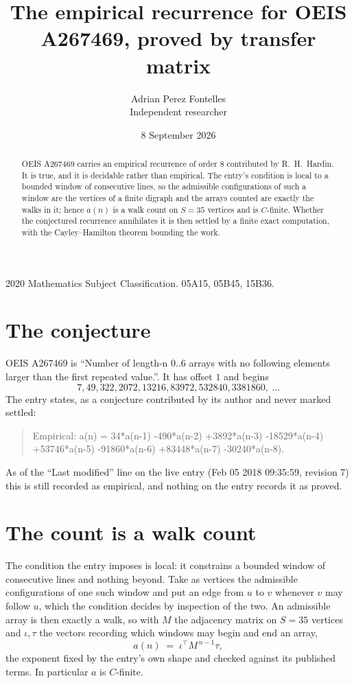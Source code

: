 \documentclass[11pt,a4paper]{article}
\title{The empirical recurrence for OEIS A267469, proved by transfer matrix}
\author{Adrian Perez Fontelles\\ \small Independent researcher}
\date{8 September 2026}
\theoremstyle{plain}
\theoremstyle{definition}
\begin{document}
\maketitle

\begin{abstract}
OEIS A267469 carries an empirical recurrence of order $8$ contributed by R.~H.~Hardin. It is
true, and it is decidable rather than empirical. The entry's condition is local to a bounded window of consecutive lines, so
the admissible configurations of such a window are the vertices of a finite digraph and the
arrays counted are exactly the walks in it; hence $a(n)$ is a walk count on $S=35$ vertices
and is $C$-finite. Whether the conjectured recurrence annihilates it is then settled by a
finite exact computation, with the Cayley--Hamilton theorem bounding the work.
\end{abstract}

\noindent\small 2020 Mathematics Subject Classification. 05A15, 05B45, 15B36.\normalsize

\section{The conjecture}

OEIS A267469 is ``Number of length-n 0..6 arrays with no following elements larger than the first repeated value.''. It has offset $1$ and begins
\[
7, 49, 322, 2072, 13216, 83972, 532840, 3381860,\ \dots
\]
The entry states, as a conjecture contributed by its author and never marked settled:
\begin{quote}
Empirical: a(n) = 34*a(n-1) -490*a(n-2) +3892*a(n-3) -18529*a(n-4) +53746*a(n-5) -91860*a(n-6) +83448*a(n-7) -30240*a(n-8).
\end{quote}
As of the ``Last modified'' line on the live entry (Feb 05 2018 09:35:59, revision 7) this is still
recorded as empirical, and nothing on the entry records it as proved.

\section{The count is a walk count}

The condition the entry imposes is local: it constrains a bounded window of consecutive lines and nothing beyond. Take as
vertices the admissible configurations of one such window and put an edge from $u$ to $v$
whenever $v$ may follow $u$, which the condition decides by inspection of the two. An
admissible array is then exactly a walk, so with $M$ the adjacency matrix on $S=35$ vertices
and $\iota,\tau$ the vectors recording which windows may begin and end an array,
\[
a(n)\;=\;\iota^{\!\top}M^{\,n-1}\tau ,
\]
the exponent fixed by the entry's own shape and checked against its published terms. In
particular $a$ is $C$-finite.
\end{document}
